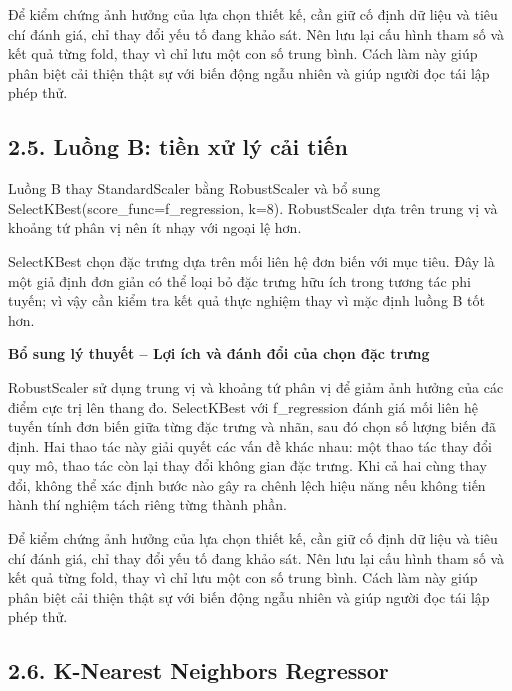 \documentclass[12pt,a4paper,oneside]{article}
\begin{document}
Để kiểm chứng ảnh hưởng của lựa chọn thiết kế, cần giữ cố định dữ liệu và tiêu chí đánh giá, chỉ thay đổi yếu tố đang khảo sát. Nên lưu lại cấu hình tham số và kết quả từng fold, thay vì chỉ lưu một con số trung bình. Cách làm này giúp phân biệt cải thiện thật sự với biến động ngẫu nhiên và giúp người đọc tái lập phép thử.\par

\subsection*{2.5. Luồng B: tiền xử lý cải tiến}

Luồng B thay StandardScaler bằng RobustScaler và bổ sung
SelectKBest(score\_func=f\_regression, k=8). RobustScaler dựa trên trung
vị và khoảng tứ phân vị nên ít nhạy với ngoại lệ hơn.

SelectKBest chọn đặc trưng dựa trên mối liên hệ đơn biến với mục tiêu.
Đây là một giả định đơn giản có thể loại bỏ đặc trưng hữu ích trong
tương tác phi tuyến; vì vậy cần kiểm tra kết quả thực nghiệm thay vì mặc
định luồng B tốt hơn.


\par\noindent\textbf{Bổ sung lý thuyết -- Lợi ích và đánh đổi của chọn đặc trưng}\par
RobustScaler sử dụng trung vị và khoảng tứ phân vị để giảm ảnh hưởng của các điểm cực trị lên thang đo. SelectKBest với f\_regression đánh giá mối liên hệ tuyến tính đơn biến giữa từng đặc trưng và nhãn, sau đó chọn số lượng biến đã định. Hai thao tác này giải quyết các vấn đề khác nhau: một thao tác thay đổi quy mô, thao tác còn lại thay đổi không gian đặc trưng. Khi cả hai cùng thay đổi, không thể xác định bước nào gây ra chênh lệch hiệu năng nếu không tiến hành thí nghiệm tách riêng từng thành phần.\par

Để kiểm chứng ảnh hưởng của lựa chọn thiết kế, cần giữ cố định dữ liệu và tiêu chí đánh giá, chỉ thay đổi yếu tố đang khảo sát. Nên lưu lại cấu hình tham số và kết quả từng fold, thay vì chỉ lưu một con số trung bình. Cách làm này giúp phân biệt cải thiện thật sự với biến động ngẫu nhiên và giúp người đọc tái lập phép thử.\par

\subsection*{2.6. K-Nearest Neighbors Regressor}
\end{document}
